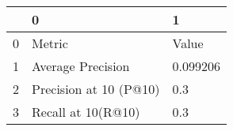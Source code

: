\begin{tabular}{lll}
\toprule
{} &                       0 &         1 \\
\midrule
0 &                  Metric &     Value \\
1 &       Average Precision &  0.099206 \\
2 &  Precision at 10 (P@10) &       0.3 \\
3 &      Recall at 10(R@10) &       0.3 \\
\bottomrule
\end{tabular}
